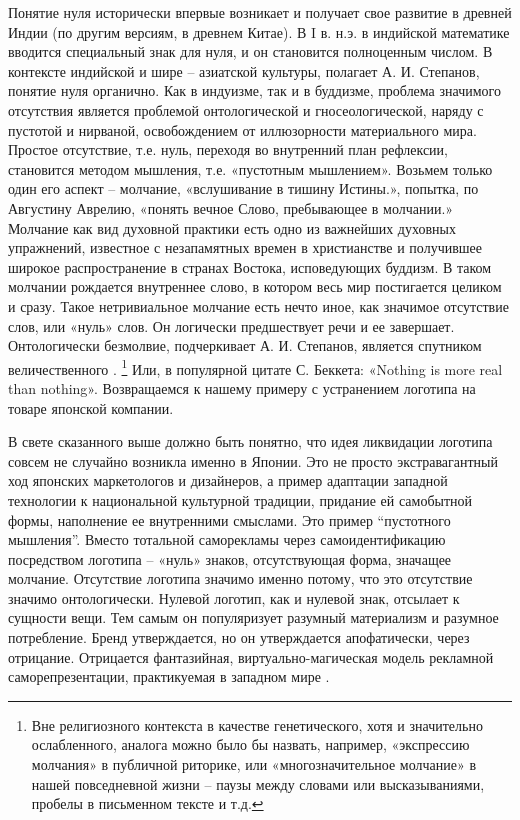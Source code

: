Понятие нуля исторически впервые возникает и получает свое развитие в древней Индии (по другим версиям, в древнем Китае). В I в. н.э. в индийской математике вводится специальный знак для нуля, и он становится полноценным числом\autocite[][351]{stepanov2004}.  В контексте индийской и шире -- азиатской культуры, полагает А. И. Степанов, понятие нуля органично. Как в индуизме, так и в буддизме, проблема значимого отсутствия является проблемой онтологической и гносеологической, наряду с пустотой и нирваной, освобождением от иллюзорности материального мира. Простое отсутствие, т.е. нуль, переходя во внутренний план рефлексии, становится методом мышления, т.е. «пустотным мышлением»\autocite[][352]{stepanov2004}. Возьмем только один его аспект -- молчание, «вслушивание в тишину Истины.», попытка, по Августину Аврелию, «понять вечное Слово, пребывающее в молчании.» \autocite[][ХI, 6, 8]{avgustin1992} Молчание как вид духовной практики есть одно из важнейших духовных упражнений, известное с незапамятных времен в христианстве и получившее широкое распространение в странах Востока, исповедующих буддизм. В таком молчании рождается внутреннее слово, в котором весь мир постигается  целиком и сразу\autocite[][112-125]{nestik1998}. Такое нетривиальное молчание есть нечто иное, как значимое отсутствие слов, или «нуль» слов. Он логически предшествует речи и ее завершает. Онтологически безмолвие, подчеркивает А. И. Степанов, является спутником величественного \autocite[][358]{stepanov2004}. \footnote{Вне религиозного контекста  в качестве генетического, хотя и значительно ослабленного,  аналога можно было бы назвать, например,  «экспрессию молчания» в публичной риторике,  или «многозначительное молчание» в нашей повседневной жизни – паузы между словами или высказываниями, пробелы в письменном тексте и т.д.} Или, в популярной цитате С. Беккета: «Nothing is more real than nothing»\autocite[][63]{esslin2004}. Возвращаемся к нашему примеру с устранением логотипа на товаре японской компании.

В свете сказанного выше должно быть понятно, что идея ликвидации логотипа совсем не случайно возникла именно в Японии. Это не просто экстравагантный ход японских маркетологов и дизайнеров, а пример адаптации западной технологии к национальной культурной традиции, придание ей самобытной формы, наполнение ее внутренними смыслами. Это пример “пустотного мышления”. Вместо тотальной саморекламы через самоидентификацию посредством логотипа -- «нуль» знаков, отсутствующая форма, значащее молчание.  Отсутствие логотипа значимо именно потому, что это отсутствие значимо онтологически. Нулевой логотип, как и нулевой знак, отсылает к сущности вещи. Тем самым он  популяризует  разумный материализм и разумное потребление.  Бренд утверждается, но он утверждается апофатически, через отрицание. Отрицается фантазийная, виртуально-магическая модель рекламной саморепрезентации, практикуемая в западном мире \autocite[][410-423]{williams1999}.

